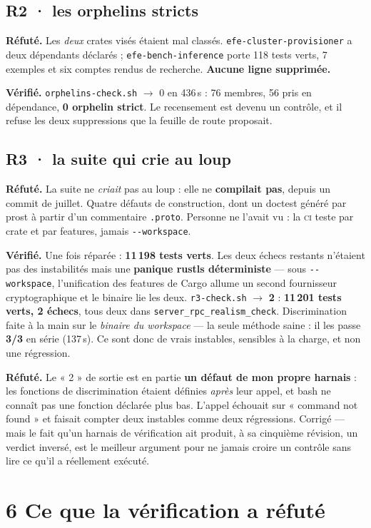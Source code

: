 \documentclass[11pt]{article}
\newcommand{\code}[1]{\texttt{\small #1}}
\newcommand{\pire}[1]{{\color{efered}\textbf{#1}}}
\newcommand{\moyen}[1]{{\color{efeamber}\textbf{#1}}}
\newcommand{\mm}[1]{\textbf{#1}}
\newcommand{\mesure}[1]{{\color{efeteal}\textbf{Vérifié.} }#1\par}
\newcommand{\refute}[1]{{\color{efered}\textbf{Réfuté.} }#1\par}
\begin{document}
\subsection{\mm{R2} · les orphelins stricts}
\refute{Les \emph{deux} crates visés étaient mal classés. \code{efe-cluster-provisioner} a deux
dépendants déclarés ; \code{efe-bench-inference} porte 118 tests verts, 7 exemples et six comptes
rendus de recherche. \textbf{Aucune ligne supprimée.}}
\mesure{\code{orphelins-check.sh} $\rightarrow$ 0 en 436\,s : 76 membres, 56 pris en dépendance,
\textbf{0 orphelin strict}. Le recensement est devenu un contrôle, et il refuse les deux
suppressions que la feuille de route proposait.}

\subsection{\mm{R3} · la suite qui crie au loup}
\refute{La suite ne \emph{criait} pas au loup : elle ne \pire{compilait pas}, depuis un commit de
juillet. Quatre défauts de construction, dont un doctest généré par prost à partir d'un commentaire
\code{.proto}. Personne ne l'avait vu : la \textsc{ci} teste par crate et par features, jamais
\code{-{}-workspace}.}
\mesure{Une fois réparée : \textbf{11\,198 tests verts}. Les deux échecs restants n'étaient pas des
instabilités mais une \textbf{panique rustls déterministe} --- sous \code{-{}-workspace}, l'unification
des features de Cargo allume un second fournisseur cryptographique et le binaire lie les deux.
\code{r3-check.sh} $\rightarrow$ \moyen{2} : \textbf{11\,201 tests verts, 2 échecs}, tous deux dans
\code{server\_rpc\_realism\_check}. Discrimination faite à la main sur le \emph{binaire du
workspace} --- la seule méthode saine : il les passe \textbf{3/3} en série (137\,s). Ce sont donc
de vrais instables, sensibles à la charge, et non une régression.}
\refute{Le « 2 » de sortie est en partie \textbf{un défaut de mon propre harnais} : les fonctions de
discrimination étaient définies \emph{après} leur appel, et bash ne connaît pas une fonction
déclarée plus bas. L'appel échouait sur « command not found » et faisait compter deux instables comme
deux régressions. Corrigé --- mais le fait qu'un harnais de vérification ait produit, à sa cinquième
révision, un verdict inversé, est le meilleur argument pour ne jamais croire un contrôle sans lire ce
qu'il a réellement exécuté.}

\section{6 \;\textbar\; Ce que la vérification a réfuté}
\end{document}
